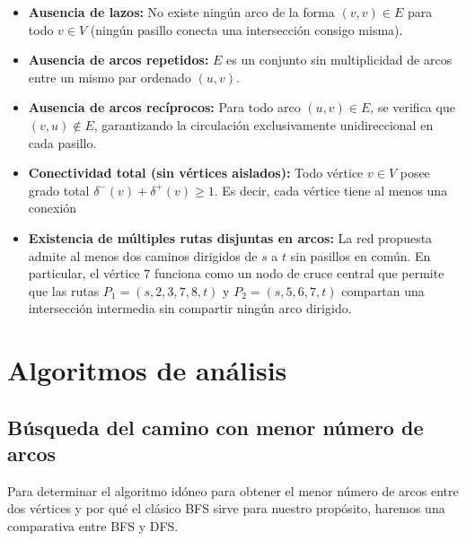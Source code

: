\documentclass[12pt,a4paper]{article}
\begin{document}
\begin{itemize}
\item
  \textbf{Ausencia de lazos:} No existe ningún arco de la forma \((v, v) \in E\) para todo \(v \in V\) (ningún pasillo conecta una intersección consigo misma).
\item
  \textbf{Ausencia de arcos repetidos:} \(E\) es un conjunto sin multiplicidad de arcos entre un mismo par ordenado \((u, v)\).
\item
  \textbf{Ausencia de arcos recíprocos:} Para todo arco \((u, v) \in E\), se verifica que \((v, u) \notin E\), garantizando la circulación exclusivamente unidireccional en cada pasillo.
\item
  \textbf{Conectividad total (sin vértices aislados):} Todo vértice \(v \in V\) posee grado total \(\delta^-(v) + \delta^+(v) \ge 1\). Es decir, cada vértice tiene al menos una conexión
\item
  \textbf{Existencia de múltiples rutas disjuntas en arcos:} La red propuesta admite al menos dos caminos dirigidos de \(s\) a \(t\) sin pasillos en común. En particular, el vértice \(7\) funciona como un nodo de cruce central que permite que las rutas \(P_1 = (s, 2, 3, 7, 8, t)\) y \(P_2 = (s, 5, 6, 7, t)\) compartan una intersección intermedia sin compartir ningún arco dirigido.
\end{itemize}

\section{Algoritmos de análisis}\label{algoritmos-de-anuxe1lisis}

\subsection{Búsqueda del camino con menor número de arcos}\label{buxfasqueda-del-camino-con-menor-nuxfamero-de-arcos}

Para determinar el algoritmo idóneo para obtener el menor número de arcos entre dos vértices y por qué el clásico BFS sirve para nuestro propósito, haremos una comparativa entre BFS y DFS.
\end{document}
